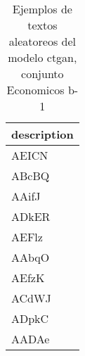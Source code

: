 \begin{table}[H]
\centering
\fontsize{8}{14}\selectfont
\caption{Ejemplos de textos aleatoreos del modelo ctgan, conjunto Economicos b-1}
\label{table-sample10-economicos-b-1-ctgan-text}
\begin{tabular}{|m{50em}|}
\hline
\rowcolor[gray]{0.8}
description \\
\hline AEICN \\
\hline ABcBQ \\
\hline AAifJ \\
\hline ADkER \\
\hline AEFlz \\
\hline AAbqO \\
\hline AEfzK \\
\hline ACdWJ \\
\hline ADpkC \\
\hline AADAe \\
\hline
\end{tabular}
\end{table}
